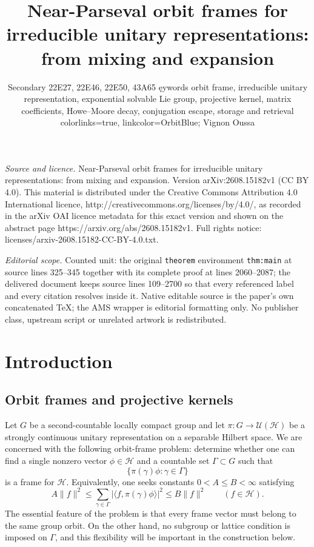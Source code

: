 \documentclass[10pt,a4paper]{amsart}
\numberwithin{equation}{section}
\newcommand{\cH}{\mathcal H}
\newcommand{\U}{\mathcal U}
\begin{document}
\title[Near-Parseval orbit frames for irreducible unitary represent]{Near-Parseval orbit frames for irreducible unitary representations: from mixing and expansion}
\author{Secondary 22E27, 22E46, 22E50, 43A65 ęywords orbit frame, irreducible unitary representation, exponential solvable Lie group, projective kernel, matrix coefficients, Howe--Moore decay, conjugation escape, storage and retrieval colorlinks=true, linkcolor=OrbitBlue; Vignon Oussa}
\date{}
\maketitle
\noindent\emph{Source and licence.} Near-Parseval orbit frames for irreducible unitary representations: from mixing and expansion. Version arXiv:2608.15182v1 (CC BY 4.0). This material is distributed under the Creative Commons Attribution 4.0 International licence, http://creativecommons.org/licenses/by/4.0/, as recorded in the arXiv OAI licence metadata for this exact version and shown on the abstract page https://arxiv.org/abs/2608.15182v1. Full rights notice: licenses/arxiv-2608.15182-CC-BY-4.0.txt.\par\smallskip
\noindent\textit{Editorial scope.} Counted unit: the original \texttt{theorem} environment \texttt{thm:main} at source lines 325--345 together with its complete proof at lines 2060--2087; the delivered document keeps source lines 109--2700 so that every referenced label and every citation resolves inside it. Native editable source is the paper's own concatenated TeX; the AMS wrapper is editorial formatting only. No publisher class, upstream script or unrelated artwork is redistributed.
\section{Introduction}\label{sec:introduction}

\subsection{Orbit frames and projective kernels}

Let $G$ be a second-countable locally compact group and let
$\pi:G\to\U(\cH)$ be a strongly continuous unitary representation on a
separable Hilbert space.  We are concerned with the following orbit-frame
problem: determine whether one can find a single nonzero vector
$\phi\in\cH$ and a countable set $\Gamma\subset G$ such that
\[
   \{\pi(\gamma)\phi:\gamma\in\Gamma\}
\]
is a frame for $\cH$.  Equivalently, one seeks constants
$0<A\leq B<\infty$ satisfying
\begin{equation}\label{eq:intro-frame-definition}
 A\|f\|^2
 \leq \sum_{\gamma\in\Gamma}
       |\langle f,\pi(\gamma)\phi\rangle|^2
 \leq B\|f\|^2
 \qquad(f\in\cH).
\end{equation}
The essential feature of the problem is that every frame vector must belong
to the same group orbit.  On the other hand, no subgroup or lattice condition
is imposed on $\Gamma$, and this flexibility will be important in the
construction below.
\end{document}
